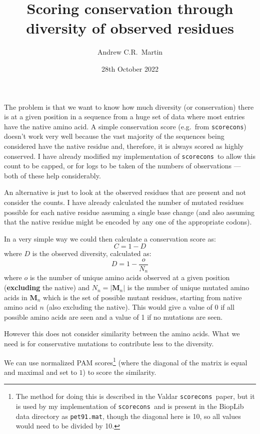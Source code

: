 \documentclass[a4paper]{article}
\title{Scoring conservation through diversity of observed residues}
\author{Andrew C.R.\ Martin}
\date{28th October 2022}
\newcommand{\sco}{{\tt scorecons}}
\begin{document}
\maketitle

The problem is that we want to know how much diversity (or
conservation) there is at a given position in a sequence from a huge
set of data where most entries have the native amino acid. A simple
conservation score (e.g.\ from \sco) doesn't work very well because
the vast majority of the sequences being considered have the native
residue and, therefore, it is always scored as highly conserved. I
have already modified my implementation of \sco\ to allow this count
to be capped, or for logs to be taken of the numbers of observations
--- both of these help considerably.

An alternative is just to look at the observed residues that are
present and not consider the counts. I have already calculated the
number of mutated residues possible for each native residue assuming a
single base change (and also assuming that the native residue might be
encoded by any one of the appropriate codons).

In a very simple way we could then calculate a conservation score as:
\begin{equation}
  C = 1 - D
\end{equation}
where $D$ is the observed diversity, calculated as:
\begin{equation}
  D = 1 - \frac{o}{N_n}
\label{eqn:D1}
\end{equation}
where $o$ is the number of unique amino acids observed at a given
position ({\bfseries excluding} the native) and $N_n = |\mathbf M_n|$ is the
number of unique mutated amino acids in $\mathbf M_n$ which is the set of
possible mutant residues, starting from native amino acid $n$ (also
excluding the native). This would give a value of 0 if all possible
amino acids are seen and a value of 1 if no mutations are seen.

However this does not consider similarity between the amino
acids.  What we need is for conservative mutations to contribute less
to the diversity.

We can use normalized PAM scores\footnote{The method for doing this is
  described in the Valdar \sco\ paper, but it is used by my
  implementation of \sco\ and is present in the BiopLib data directory
  as {\tt pet91.mat}, though the diagonal here is 10, so all values
  would need to be divided by 10.} (where the diagonal of the matrix
is equal and maximal and set to $1$) to score the similarity.
\end{document}
